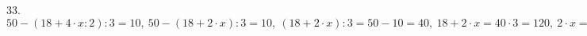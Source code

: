 33. $50-(18+4\cdot x:2):3=10,\ 50-(18+2\cdot x):3=10,\ (18+2\cdot x):3=50-10=40,\ 18+2\cdot x=40\cdot3=120,\ 2\cdot x=120-18=102,\ x=102:2=51.$\\
